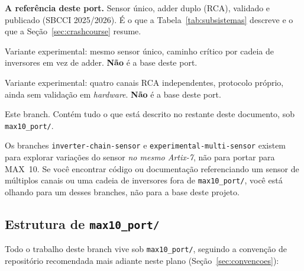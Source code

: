 \documentclass[11pt,a4paper]{article}
\begin{document}
\begin{description}[leftmargin=0em,style=nextline,itemsep=6pt]
  \item[\texttt{main}]
        \textbf{A referência deste port.} Sensor único, adder duplo (RCA), validado
        e publicado (SBCCI 2025/2026). É o que a Tabela~\ref{tab:subsistemas}
        descreve e o que a Seção~\ref{sec:crashcourse} resume.
  \item[\texttt{inverter-chain-sensor}]
        Variante experimental: mesmo sensor único, caminho crítico por cadeia de
        inversores em vez de adder. \textbf{Não} é a base deste port.
  \item[\texttt{experimental-multi-sensor}]
        Variante experimental: quatro canais RCA independentes, protocolo próprio,
        ainda sem validação em \emph{hardware}. \textbf{Não} é a base deste port.
  \item[\texttt{max10-de10lite-port}]
        Este branch. Contém tudo o que está descrito no restante deste documento,
        sob \texttt{max10\_port/}.
\end{description}

\begin{warnbox}[title={Não confundir os branches experimentais com a referência}]
Os branches \texttt{inverter-chain-sensor} e \texttt{experimental-multi-sensor}
existem para explorar variações do sensor \emph{no mesmo Artix-7}, não para portar
para MAX~10. Se você encontrar código ou documentação referenciando um sensor de
múltiplos canais ou uma cadeia de inversores fora de \texttt{max10\_port/}, você está
olhando para um desses branches, não para a base deste projeto.
\end{warnbox}

\subsection{Estrutura de \texttt{max10\_port/}}

Todo o trabalho deste branch vive sob \texttt{max10\_port/}, seguindo a convenção de
repositório recomendada mais adiante neste plano (Seção~\ref{sec:convencoes}):
\end{document}
